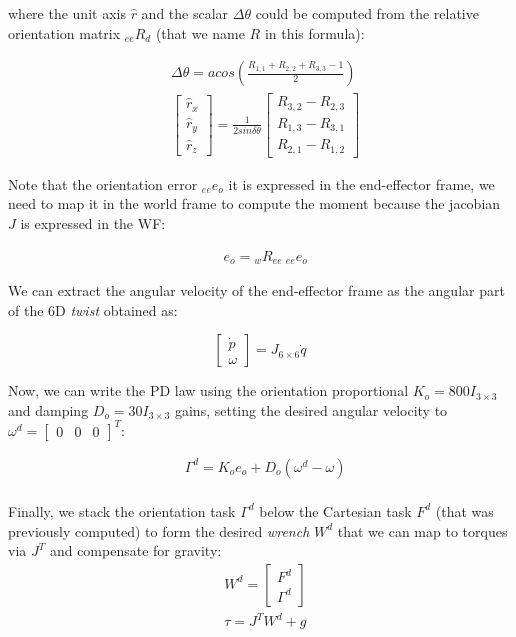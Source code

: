 \documentclass[11pt]{article}
\newcommand{\mat}[1]{\ensuremath{\begin{bmatrix}#1\end{bmatrix}}}	%
\begin{document}
where the unit axis $\hat{r}$  and the scalar $\Delta \theta$ could be computed from 
the relative orientation matrix ${}_{ee}R_d$ (that we name $R$ in this formula): 

\begin{align}
& \Delta \theta = acos\left(\frac{R_{1,1} + R_{2,2} +R_{3,3} -1}{2}\right)\\
&\mat{\hat{r}_x \\ \hat{r}_y\\ \hat{r}_z} = \frac{1}{2sin \delta \theta} \mat{R_{3,2} - R_{2,3} \\R_{1,3} - R_{3,1}\\R_{2,1} - R_{1,2}}
\end{align}



Note that  the orientation error ${}_{ee}e_o$ it is expressed in the end-effector frame,
we need to map it in the world frame to compute the moment because the jacobian $J$ is expressed in the WF:

\begin{align}
&e_o = {}_wR_{ee} ~{}_{ee} e_o
\end{align}

We can extract the angular velocity of the end-effector frame as the angular part of the 6D \textit{twist} obtained as:

\begin{equation}
\mat{\dot{p}\\ \omega} = J_{6\times6} \dot{q}
\end{equation}

Now, we can write the PD law using the orientation proportional $K_{o} = 800I_{3\times3}$ and damping $D_o = 30I_{3\times3}$ gains, setting the desired angular velocity to  $\omega^d = \mat{0&0&0}^T$: 

\begin{align}
& \Gamma^d  = K_{o} e_o  + D_o(\omega^d - \omega)  \\
\end{align}

Finally, we stack the orientation task $\Gamma^d$ below  the Cartesian task $F^d$ (that was previously computed) to form the desired \textit{wrench} $W^d$ that we can map to torques via $J^T$ and compensate for gravity:
\begin{align}
&W^d=\mat{F^d \\ \Gamma^d}\\
&\tau = J^TW^d + g
\end{align}
\end{document}
